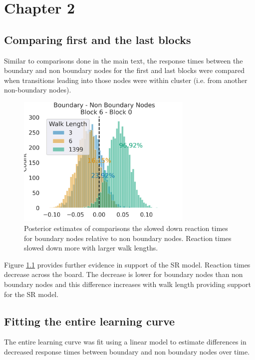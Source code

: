 \chapter{Chapter 2}

\section{Comparing first and the last blocks}

Similar to comparisons done in the main text, the response times between the boundary and non boundary nodes for the first and last blocks were compared when transitions leading into those nodes were within cluster (i.e. from another non-boundary nodes).

\begin{figure}[H]
    \centering
    \includegraphics[width = 0.75\textwidth]{chapter_notebooks/chapter_2/figures/nb_b_diff_block60.png}
    \caption{Posterior estimates of comparisons the slowed down reaction times for boundary nodes relative to non boundary nodes. Reaction times slowed down more with larger walk lengths.}
    \label{fig:bayesmodel-firstlastblocks}
\end{figure}

Figure \ref{fig:bayesmodel-firstlastblocks} provides further evidence in support of the SR model. Reaction times decrease across the board. The decrease is lower for boundary nodes than non boundary nodes and this difference increases with walk length providing support for the SR model. 

\section{Fitting the entire learning curve}
The entire learning curve was fit using a linear model to estimate differences in decreased response times between boundary and non boundary nodes over time. 


